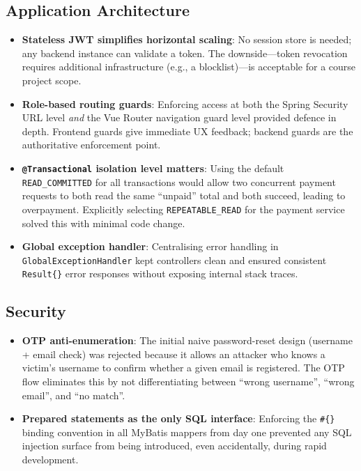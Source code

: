 \documentclass[12pt,letterpaper]{article}
\begin{document}
\subsection{Application Architecture}

\begin{itemize}
  \item \textbf{Stateless JWT simplifies horizontal scaling}: No session store is needed; any backend instance can validate a token. The downside---token revocation requires additional infrastructure (e.g., a blocklist)---is acceptable for a course project scope.

  \item \textbf{Role-based routing guards}: Enforcing access at both the Spring Security URL level \emph{and} the Vue Router navigation guard level provided defence in depth. Frontend guards give immediate UX feedback; backend guards are the authoritative enforcement point.

  \item \textbf{\texttt{@Transactional} isolation level matters}: Using the default \texttt{READ\_COMMITTED} for all transactions would allow two concurrent payment requests to both read the same ``unpaid'' total and both succeed, leading to overpayment. Explicitly selecting \texttt{REPEATABLE\_READ} for the payment service solved this with minimal code change.

  \item \textbf{Global exception handler}: Centralising error handling in \texttt{GlobalExceptionHandler} kept controllers clean and ensured consistent \texttt{Result\{\}} error responses without exposing internal stack traces.
\end{itemize}

\subsection{Security}

\begin{itemize}
  \item \textbf{OTP anti-enumeration}: The initial naive password-reset design (username + email check) was rejected because it allows an attacker who knows a victim's username to confirm whether a given email is registered. The OTP flow eliminates this by not differentiating between ``wrong username'', ``wrong email'', and ``no match''.

  \item \textbf{Prepared statements as the only SQL interface}: Enforcing the \texttt{\#\{\}} binding convention in all MyBatis mappers from day one prevented any SQL injection surface from being introduced, even accidentally, during rapid development.
\end{itemize}
\end{document}
